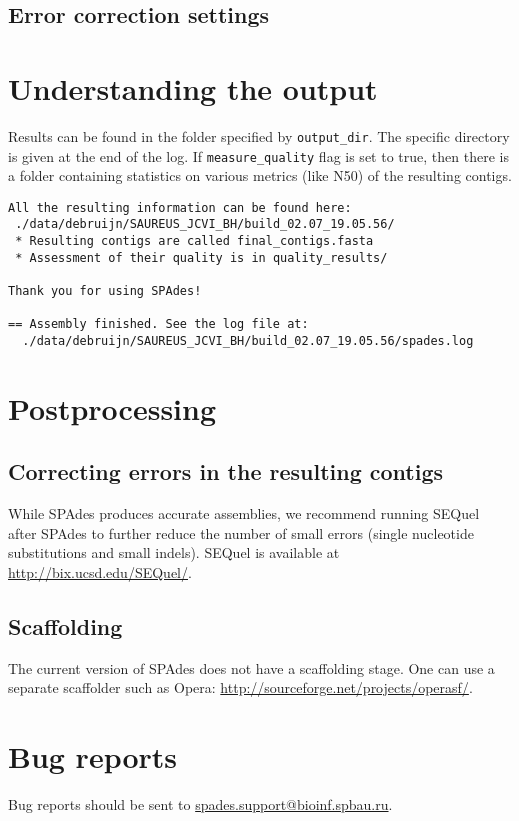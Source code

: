 \documentclass{article}
\def\spades{SPAdes}
\begin{document}
\subsection{Error correction settings}


\section{Understanding the output}
Results can be found in the folder specified by {\tt output\_dir}.
The specific directory is given at the end of the log.
If {\tt measure\_quality} flag is set to true, then 
there is a folder containing statistics on various metrics (like N50) of the resulting contigs.
\begin{lstlisting}
All the resulting information can be found here: 
 ./data/debruijn/SAUREUS_JCVI_BH/build_02.07_19.05.56/
 * Resulting contigs are called final_contigs.fasta
 * Assessment of their quality is in quality_results/

Thank you for using SPAdes!

== Assembly finished. See the log file at: 
  ./data/debruijn/SAUREUS_JCVI_BH/build_02.07_19.05.56/spades.log
\end{lstlisting}

\section{Postprocessing}

\subsection{Correcting errors in the resulting contigs}
While {\spades} produces accurate assemblies, 
we recommend running SEQuel after {\spades} to further reduce the number of 
small errors (single nucleotide substitutions and small indels). SEQuel is available at
\url{http://bix.ucsd.edu/SEQuel/}.


\subsection{Scaffolding}
The current version of {\spades} does not have a scaffolding stage.
One can use a separate scaffolder such as Opera: \url{http://sourceforge.net/projects/operasf/}.

\section{Bug reports}
Bug reports should be sent to \url{spades.support@bioinf.spbau.ru}.




\end{document}
